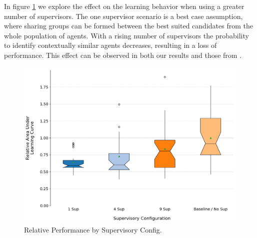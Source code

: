 \documentclass[letterpaper]{article}
\begin{document}
In figure \ref{fig:sups} we explore the effect on the learning behavior when using a greater number of supervisors. The one supervisor scenario is a best case assumption, where sharing groups can be formed between the best suited candidates from the whole population of agents. With a rising number of supervisors the probability to identify contextually similar agents decreases, resulting in a loss of performance. This effect can be observed in both our results and those from \citeauthor{garant2015accelerating}.
\begin{figure}[H]
 \begin{center}
  \includegraphics[width=\linewidth]{figures/figure7}
  \caption{Relative Performance by Supervisory Config.}
  \label{fig:sups}
 \end{center}
\end{figure}
\end{document}
